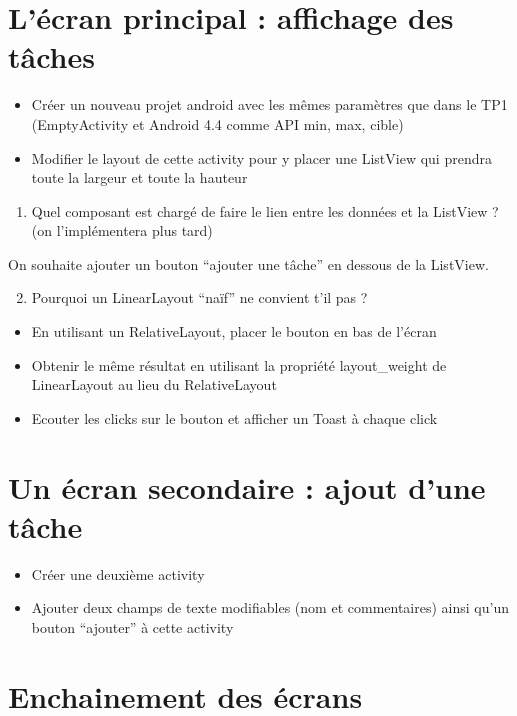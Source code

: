 \documentclass{article}
\begin{document}
\section{L'écran principal : affichage des tâches}
\begin{itemize}
  \item Créer un nouveau projet android avec les mêmes paramètres que dans le
  TP1 (EmptyActivity et Android 4.4 comme API min, max, cible)
  \item Modifier le layout de cette activity pour y placer une ListView qui
  prendra toute la largeur et toute la hauteur
\end{itemize}
\begin{enumerate}
 \setcounter{enumi}{0}
 \item Quel composant est chargé de faire le lien entre les données et la
 ListView ? (on l'implémentera plus tard)
 \end{enumerate}
 On souhaite ajouter un bouton ``ajouter une tâche'' en dessous de la ListView.
 \begin{enumerate}
 \setcounter{enumi}{1}
\item Pourquoi un LinearLayout ``naïf'' ne convient t'il pas ?
\end{enumerate}
\begin{itemize}
 \item En utilisant un RelativeLayout, placer le bouton en bas de l'écran
  \item Obtenir le même résultat en utilisant la propriété layout\_weight de
  LinearLayout au lieu du RelativeLayout
  \item Ecouter les clicks sur le bouton et afficher un Toast à chaque click
\end{itemize}
\section{Un écran secondaire : ajout d'une tâche}
\begin{itemize}
  \item Créer une deuxième activity
  \item Ajouter deux champs de texte modifiables (nom et commentaires) ainsi
  qu'un bouton ``ajouter'' à cette activity
\end{itemize}
\section{Enchainement des écrans}
\end{document}
